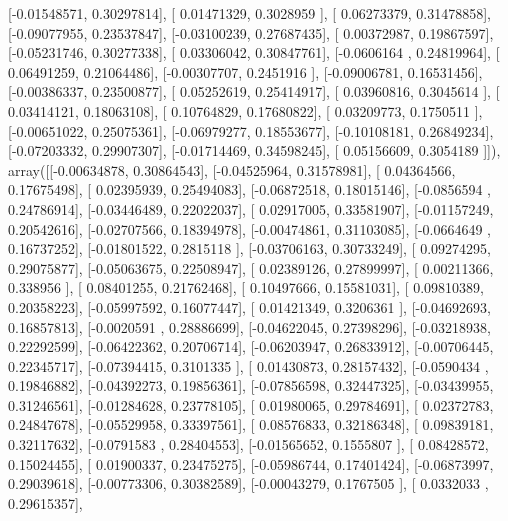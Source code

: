 \documentclass{article}
\begin{document}
       [-0.01548571,  0.30297814],
       [ 0.01471329,  0.3028959 ],
       [ 0.06273379,  0.31478858],
       [-0.09077955,  0.23537847],
       [-0.03100239,  0.27687435],
       [ 0.00372987,  0.19867597],
       [-0.05231746,  0.30277338],
       [ 0.03306042,  0.30847761],
       [-0.0606164 ,  0.24819964],
       [ 0.06491259,  0.21064486],
       [-0.00307707,  0.2451916 ],
       [-0.09006781,  0.16531456],
       [-0.00386337,  0.23500877],
       [ 0.05252619,  0.25414917],
       [ 0.03960816,  0.3045614 ],
       [ 0.03414121,  0.18063108],
       [ 0.10764829,  0.17680822],
       [ 0.03209773,  0.1750511 ],
       [-0.00651022,  0.25075361],
       [-0.06979277,  0.18553677],
       [-0.10108181,  0.26849234],
       [-0.07203332,  0.29907307],
       [-0.01714469,  0.34598245],
       [ 0.05156609,  0.3054189 ]]), array([[-0.00634878,  0.30864543],
       [-0.04525964,  0.31578981],
       [ 0.04364566,  0.17675498],
       [ 0.02395939,  0.25494083],
       [-0.06872518,  0.18015146],
       [-0.0856594 ,  0.24786914],
       [-0.03446489,  0.22022037],
       [ 0.02917005,  0.33581907],
       [-0.01157249,  0.20542616],
       [-0.02707566,  0.18394978],
       [-0.00474861,  0.31103085],
       [-0.0664649 ,  0.16737252],
       [-0.01801522,  0.2815118 ],
       [-0.03706163,  0.30733249],
       [ 0.09274295,  0.29075877],
       [-0.05063675,  0.22508947],
       [ 0.02389126,  0.27899997],
       [ 0.00211366,  0.338956  ],
       [ 0.08401255,  0.21762468],
       [ 0.10497666,  0.15581031],
       [ 0.09810389,  0.20358223],
       [-0.05997592,  0.16077447],
       [ 0.01421349,  0.3206361 ],
       [-0.04692693,  0.16857813],
       [-0.0020591 ,  0.28886699],
       [-0.04622045,  0.27398296],
       [-0.03218938,  0.22292599],
       [-0.06422362,  0.20706714],
       [-0.06203947,  0.26833912],
       [-0.00706445,  0.22345717],
       [-0.07394415,  0.3101335 ],
       [ 0.01430873,  0.28157432],
       [-0.0590434 ,  0.19846882],
       [-0.04392273,  0.19856361],
       [-0.07856598,  0.32447325],
       [-0.03439955,  0.31246561],
       [-0.01284628,  0.23778105],
       [ 0.01980065,  0.29784691],
       [ 0.02372783,  0.24847678],
       [-0.05529958,  0.33397561],
       [ 0.08576833,  0.32186348],
       [ 0.09839181,  0.32117632],
       [-0.0791583 ,  0.28404553],
       [-0.01565652,  0.1555807 ],
       [ 0.08428572,  0.15024455],
       [ 0.01900337,  0.23475275],
       [-0.05986744,  0.17401424],
       [-0.06873997,  0.29039618],
       [-0.00773306,  0.30382589],
       [-0.00043279,  0.1767505 ],
       [ 0.0332033 ,  0.29615357],
\end{document}
